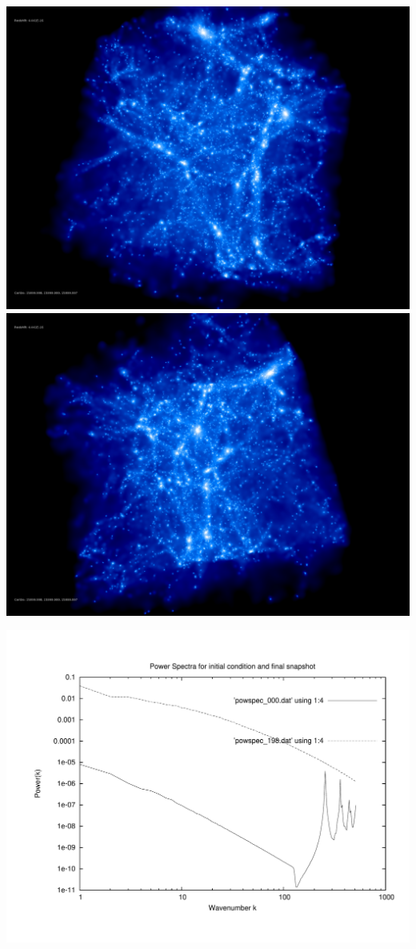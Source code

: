 \includegraphics[scale=0.1]{NGenIC_26214/rotate_00074.jpg} 
\includegraphics[scale=0.1]{NGenIC_26214/rotate_00131.jpg}

\includegraphics[scale=0.5]{NGenIC_26214/plot_powspec_NGenIC_26214}

